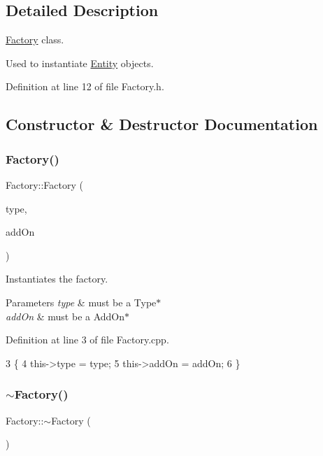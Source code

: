 \subsection{Detailed Description}
\hyperlink{classFactory}{Factory} class. 

Used to instantiate \hyperlink{classEntity}{Entity} objects. 

Definition at line 12 of file Factory.\+h.



\subsection{Constructor \& Destructor Documentation}
\mbox{\label{classFactory_aca946f8877efb5b5bae700f74537d99d}} 
\subsubsection{\texorpdfstring{Factory()}{Factory()}}
{\footnotesize\ttfamily Factory\+::\+Factory (\begin{DoxyParamCaption}\item[{\hyperlink{classType}{Type} $\ast$}]{type,  }\item[{\hyperlink{classAddOn}{Add\+On} $\ast$}]{add\+On }\end{DoxyParamCaption})}



Instantiates the factory. 


\begin{DoxyParams}{Parameters}
{\em type} & must be a Type$\ast$ \\
\hline
{\em add\+On} & must be a Add\+On$\ast$ \\
\hline
\end{DoxyParams}


Definition at line 3 of file Factory.\+cpp.


\begin{DoxyCode}
3                                          \{
4     this->type = type;
5     this->addOn = addOn;
6 \}
\end{DoxyCode}
\mbox{\label{classFactory_a8f71456f48e4df402c778a44191ff40e}} 
\subsubsection{\texorpdfstring{$\sim$\+Factory()}{~Factory()}}
{\footnotesize\ttfamily Factory\+::$\sim$\+Factory (\begin{DoxyParamCaption}{ }\end{DoxyParamCaption})}



